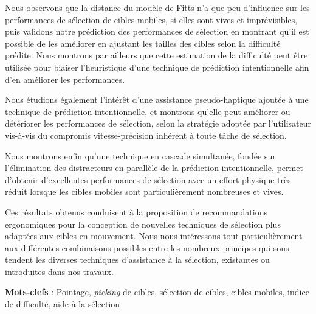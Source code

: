 	Nous observons que la distance du modèle de Fitts n'a que peu d'influence sur les performances de sélection de cibles mobiles, si elles sont vives et imprévisibles, puis validons notre prédiction des performances de sélection en montrant qu'il est possible de les améliorer en ajustant les tailles des cibles selon la difficulté prédite. Nous montrons par ailleurs que cette estimation de la difficulté peut être utilisée pour biaiser l'heuristique d'une technique de prédiction intentionnelle afin d'en améliorer les performances.
	
	Nous étudions également l'intérêt d'une assistance pseudo-haptique ajoutée à une technique de prédiction intentionnelle, et montrons qu'elle peut améliorer ou détériorer les performances de sélection, selon la stratégie adoptée par l'utilisateur vis-à-vis du compromis vitesse-précision inhérent à toute tâche de sélection.
	
	Nous montrons enfin qu'une technique en \og cascade \fg{} simultanée, fondée sur l'élimination des distracteurs en parallèle de la prédiction intentionnelle, permet d'obtenir d'excellentes performances de sélection avec un effort physique très réduit lorsque les cibles mobiles sont particulièrement nombreuses et vives.
	
	Ces résultats obtenus conduisent à la proposition de recommandations ergonomiques pour la conception de nouvelles techniques de sélection plus adaptées aux cibles en mouvement. Nous nous intéressons tout particulièrement aux différentes combinaisons possibles entre les nombreux principes qui sous-tendent les diverses techniques d'assistance à la sélection, existantes ou introduites dans nos travaux.
 
\textbf{Mots-clefs} : Pointage, \emph{picking} de cibles, sélection de cibles, cibles mobiles, indice de difficulté, aide à la sélection